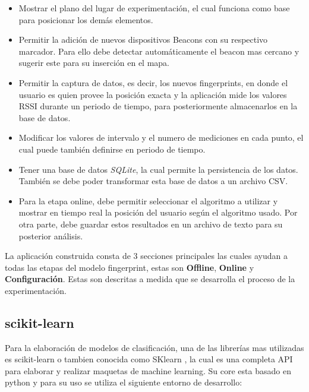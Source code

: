 \begin{itemize}
\item Mostrar el plano del lugar de experimentación, el cual funciona como base para posicionar los demás elementos.

\item Permitir la adición de nuevos dispositivos Beacons con su respectivo marcador. Para ello debe detectar automáticamente el beacon mas cercano y sugerir este para su inserción en el mapa.

\item Permitir la captura de datos, es decir, los nuevos fingerprints, en donde el usuario es quien provee la posición exacta y la aplicación mide los valores RSSI durante un periodo de tiempo, para posteriormente almacenarlos en la base de datos. 

\item Modificar los valores de intervalo y el numero de mediciones en cada punto, el cual puede también definirse en periodo de tiempo.

\item Tener una base de datos \textit{SQLite}, la cual permite la persistencia de los datos. También se debe poder transformar esta base de datos a un archivo CSV.

\item Para la etapa online, debe permitir seleccionar el algoritmo a utilizar y mostrar en tiempo real la posición del usuario según el algoritmo usado. Por otra parte, debe guardar estos resultados en un archivo de texto para su posterior análisis.



\end{itemize}

La aplicación construida consta de 3 secciones principales las cuales ayudan a todas las etapas del modelo fingerprint, estas son \textbf{Offline}, \textbf{Online} y \textbf{Configuración}. Estas son descritas a medida que se desarrolla el proceso de la experimentación.


\subsection{scikit-learn}

Para la elaboración de modelos de clasificación, una de las librerías mas utilizadas es scikit-learn o tambien conocida como SKlearn \cite{scikit-learn}, la cual es una completa API para elaborar y realizar maquetas de machine learning. Su core esta basado en python y para su uso se utiliza el siguiente entorno de desarrollo:

